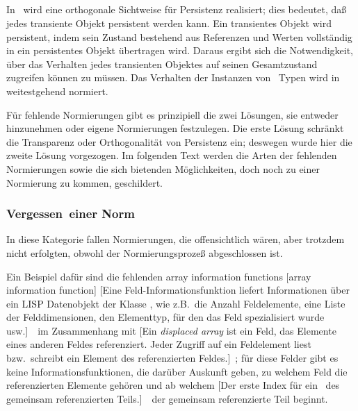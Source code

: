 \subsection{\protect\std[isierung]}\label{sec:stdiz}
%
In \plob\ wird eine orthogonale Sichtweise f\"{u}r Persistenz realisiert;
dies bedeutet, da\ss{} jedes transiente Objekt persistent werden kann.
Ein transientes Objekt wird persistent, indem sein Zustand bestehend
aus Referenzen und Werten vollst\"{a}ndig in ein persistentes Objekt
\"{u}bertragen wird. Daraus ergibt sich die Notwendigkeit, \"{u}ber das
Verhalten jedes transienten Objektes auf seinen Gesamtzustand
zugreifen k\"{o}n\-nen zu m\"{u}ssen. Das Verhalten der Instanzen von
\cl\ Typen wird in \cite{bib:st90} weitestgehend normiert.
%
\par{}F\"{u}r fehlende Normierungen gibt es prinzipiell die zwei
L\"{o}sungen, sie entweder hinzunehmen oder eigene Normierungen
festzulegen. Die erste L\"{o}sung schr\"{a}nkt die Transparenz oder
Orthogonalit\"{a}t von Persistenz ein; deswegen wurde hier die zweite
L\"{o}sung vorgezogen.
Im folgenden Text werden die Arten der fehlenden Normierungen
sowie die sich bietenden M\"{o}glichkeiten, doch noch zu einer Normierung
zu kommen, geschildert.
%
\subsubsection{{\protect\rglq}Vergessen{\protect\rgrq}\ einer Norm}
%
In diese Kategorie fallen Normierungen, die offensichtlich w\"{a}ren,
aber trotzdem nicht erfolgten, obwohl der Normierungsproze\ss{}
abgeschlossen ist.
%
\par{}Ein Beispiel daf\"{u}r sind die fehlenden
{array information functions}%
[array information function]%
[{Eine
Feld-\protect\discretionary{}{}{}In\-for\-ma\-ti\-ons\-funk\-tion
liefert Informationen \"{u}ber ein LISP Datenobjekt der Klasse
\protect{}, wie z.B.\ die Anzahl Feldelemente, eine
Liste der Felddimensionen, den Elementtyp, f\"{u}r den das Feld
spezialisiert wurde usw.}]\ \ im Zusammenhang mit
%
%
[Ein {\protect\em displaced array\/} ist ein Feld, das Elemente eines
anderen Feldes referenziert. Jeder Zugriff auf ein Feldelement liest
bzw.\ schreibt ein Element des referenzierten Feldes.]\ ;
f\"{u}r diese Felder gibt es keine Informationsfunktionen, die dar\"{u}ber
Auskunft geben, zu welchem Feld die referenzierten Elemente geh\"{o}ren
und ab welchem
[{Der erste Index f\"{u}r ein
\protect{}\ des gemeinsam
referenzierten Teils.}]\ \ der gemeinsam referenzierte
Teil beginnt.
%
